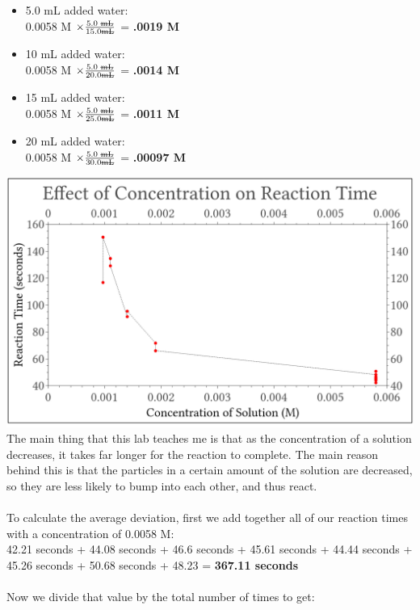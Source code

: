 \documentclass[11pt]{article}
\begin{document}
\begin {itemize}
\item 5.0 mL added water:\\
 0.0058 M $ \times \frac{\textrm{5.0 \sout{mL}}}{\textrm{15.0\sout{mL}}}$ = \textbf{.0019 M}
 \item 10 mL added water:\\
 0.0058 M $ \times \frac{\textrm{5.0 \sout{mL}}}{\textrm{20.0\sout{mL}}}$ = \textbf{.0014 M}
 \item 15 mL added water:\\
 0.0058 M $ \times \frac{\textrm{5.0 \sout{mL}}}{\textrm{25.0\sout{mL}}}$ = \textbf{.0011 M}
 \item 20 mL added water:\\
 0.0058 M $ \times \frac{\textrm{5.0 \sout{mL}}}{\textrm{30.0\sout{mL}}}$ = \textbf{.00097 M}
\end{itemize}
\includegraphics[width=\textwidth]{ConcVsTime}\\
The main thing that this lab teaches me is that as the concentration of a solution decreases, it takes far longer for the reaction to complete. The main reason behind this is that the particles in a certain amount of the solution are decreased, so they are less likely to bump into each other, and thus react. \\
\\
To calculate the average deviation, first we add together all of our reaction times with a concentration of 0.0058 M:
\\
42.21 seconds + 44.08 seconds + 46.6 seconds + 45.61 seconds + 44.44 seconds + 45.26 seconds + 50.68 seconds + 48.23 =\textbf{ 367.11 seconds}\\
\\
Now we divide that value by the total number of times to get:
\end{document}
